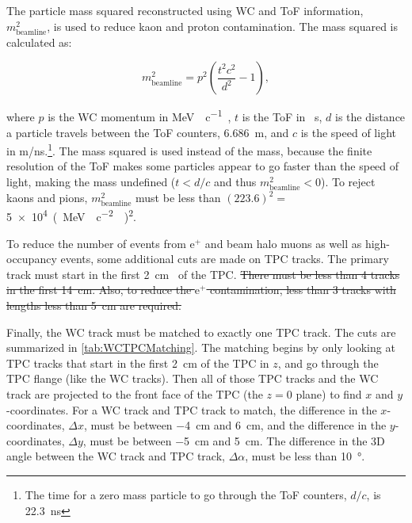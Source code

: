 \documentclass[letterpaper,12pt]{article}
\newcommand{\MeV}{\mega\electronvolt}
\newcommand{\MeVc}{\MeV{}\per c}
\newcommand{\MeVcc}{\MeV{}\per\square c}
\newcommand{\ep}{\ensuremath{\text{e}^{+}}}
\newcommand{\mSqrBeam}{\ensuremath{m^2_{\mathrm{beamline}}}}
\begin{document}
The particle mass squared reconstructed using WC and ToF information, \mSqrBeam{}, is used to
reduce kaon and proton contamination. The mass squared is calculated as:

\begin{equation}
\mSqrBeam{} = p^2 \left( \frac{t^2 c^2}{d^2} - 1 \right),
\end{equation}

where $p$ is the WC momentum in \si{\MeVc{}}, $t$ is the ToF in \si{\nano
\second}, $d$ is the distance a particle travels between the ToF counters,
\SI{6.686}{\meter}, and $c$ is the speed of light in \si[per-mode =
symbol]{\meter \per \nano \second}.\footnote{The time for a zero mass particle
to go through the ToF counters, $d/c$, is \SI{22.3}{\nano \second}}. The mass
squared is used instead of the mass, because the finite resolution of the ToF
makes some particles appear to go faster than the speed of light, making the
mass undefined ($t < d/c$ and thus $\mSqrBeam{} < 0$). To reject kaons and
pions, \mSqrBeam{} must be less than $(223.6)^2 = $ \SI{5e4}{(\MeVcc{}
)\squared}.

To reduce the number of events from \ep{} and beam halo muons as well as
high-occupancy events, some additional cuts are made on TPC tracks. The primary
track must start in the first \SI{2}{\cm{}} of the TPC. \sout{There must be
less than 4 tracks in the first \SI{14}{\cm}. Also, to reduce the \ep{}
contamination, less than 3 tracks with lengths less than \SI{5}{\cm} are
required.} %

Finally, the WC track must be matched to exactly one TPC track. The cuts are
summarized in \cref{tab:WCTPCMatching}. The matching begins by only looking at
TPC tracks that start in the first \SI{2}{\cm} of the TPC in $z$, and go
through the TPC flange (like the WC tracks). Then all of those TPC tracks and
the WC track are projected to the front face of the TPC (the $z=0$ plane) to
find $x$ and $y$-coordinates. For a WC track and TPC track to match, the
difference in the $x$-coordinates, $\Delta x$, must be between \SI{-4}{\cm} and
\SI{6}{\cm}, and the difference in the $y$-coordinates, $\Delta y$, must be
between \SI{-5}{\cm} and \SI{5}{\cm}. The difference in the 3D angle between
the WC track and TPC track, $\Delta \alpha$, must be less than
\SI{10}{\degree}.
\end{document}
